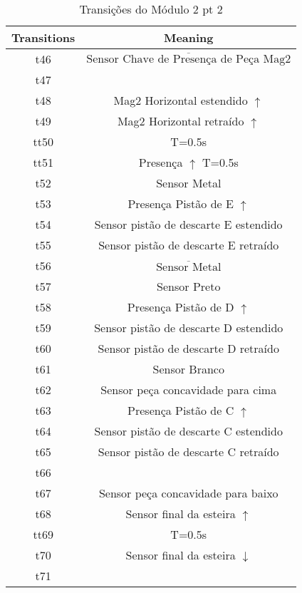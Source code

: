 \begin{table}[htbp]
\caption{Transições do Módulo 2 pt 2}
\centering
\begin{tabular}{c|c}
Transitions & Meaning\\
\hline
t46 & \(\overline{\mbox{Sensor Chave de Presença de Peça Mag2}}\)\\
t47 & \\
t48 & Mag2 Horizontal estendido \(\uparrow\)\\
t49 & Mag2 Horizontal retraído \(\uparrow\)\\
tt50 & T=0.5s\\
tt51 & Presença \(\uparrow\) T=0.5s\\
t52 & Sensor Metal\\
t53 & Presença Pistão de E \(\uparrow\)\\
t54 & Sensor pistão de descarte E estendido\\
t55 & Sensor pistão de descarte E retraído\\
t56 & \(\overline{\mbox{Sensor Metal}}\)\\
t57 & Sensor Preto\\
t58 & Presença Pistão de D \(\uparrow\)\\
t59 & Sensor pistão de descarte D estendido\\
t60 & Sensor pistão de descarte D retraído\\
t61 & Sensor Branco\\
t62 & Sensor peça concavidade para cima\\
t63 & Presença Pistão de C \(\uparrow\)\\
t64 & Sensor pistão de descarte C estendido\\
t65 & Sensor pistão de descarte C retraído\\
t66 & \\
t67 & Sensor peça concavidade para baixo\\
t68 & Sensor final da esteira \(\uparrow\)\\
tt69 & T=0.5s\\
t70 & Sensor final da esteira \(\downarrow\)\\
t71 & \\
\end{tabular}
\end{table}

